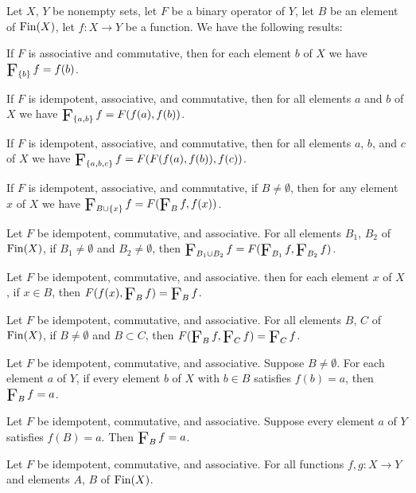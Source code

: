 \documentclass{article}
\begin{document}
Let $X$, $Y$ be nonempty sets, let $F$ be a binary operator of $Y$, let
$B$ be an element of $\operatorname{Fin}(X)$, let $f\colon X\to Y$ be a function. We
have the following results:
\begin{thm}
\item\label{setwiseo:17} If $F$ is associative and commutative, then for
  each element $b$ of $X$ we have $\iteratedBinop{F}_{\{b\}}f=f(b)$.
\item\label{setwiseo:18} If $F$ is idempotent, associative, and commutative,
  then for all elements $a$ and $b$ of $X$ we have
  $\iteratedBinop{F}_{\{a,b\}}f=F(f(a),f(b))$.
\item\label{setwiseo:19} If $F$ is idempotent, associative, and commutative,
  then for all elements $a$, $b$, and $c$ of $X$ we have
  $\iteratedBinop{F}_{\{a,b,c\}}f=F(F(f(a),f(b)),f(c))$.
\item\label{setwiseo:20} If $F$ is idempotent, associative, and commutative,
  if $B\neq\emptyset$, then for any element $x$ of $X$ we have $\iteratedBinop{F}_{B\cup\{x\}}f=F(\iteratedBinop{F}_{B}f,f(x))$.
\item\label{setwiseo:21} Let $F$ be idempotent, commutative, and associative.
  For all elements $B_{1}$, $B_{2}$ of $\operatorname{Fin}(X)$, if $B_{1}\neq\emptyset$
  and $B_{2}\neq\emptyset$, then
  $\iteratedBinop{F}_{B_{1}\cup B_{2}}f=F(\iteratedBinop{F}_{B_{1}}f,\iteratedBinop{F}_{B_{2}}f)$.
\item\label{setwiseo:22} Let $F$ be idempotent, commutative, and associative.
  then for each element $x$ of $X$, if $x\in B$, then
  $F(f(x),\iteratedBinop{F}_{B}f)=\iteratedBinop{F}_{B}f$.
\item\label{setwiseo:23} Let $F$ be idempotent, commutative, and associative.
  For all elements $B$, $C$ of $\operatorname{Fin}(X)$, if $B\neq\emptyset$
  and $B\subset C$, then
  $F(\iteratedBinop{F}_{B}f,\iteratedBinop{F}_{C}f)=\iteratedBinop{F}_{C}f$.
\item\label{setwiseo:24} Let $F$ be idempotent, commutative, and associative.
  Suppose $B\neq\emptyset$.
  For each element $a$ of $Y$, if every element $b$ of $X$ with $b\in B$
  satisfies $f(b)=a$, then $\iteratedBinop{F}_{B}f=a$.
\item\label{setwiseo:25} Let $F$ be idempotent, commutative, and associative.
  Suppose every element $a$ of $Y$ satisfies $f(B)=a$.
  Then $\iteratedBinop{F}_{B}f=a$.
\item\label{setwiseo:26} Let $F$ be idempotent, commutative, and associative.
  For all functions $f,g\colon X\to Y$ and elements $A$, $B$ of $\operatorname{Fin}(X)$.

\end{thm}
\end{document}
